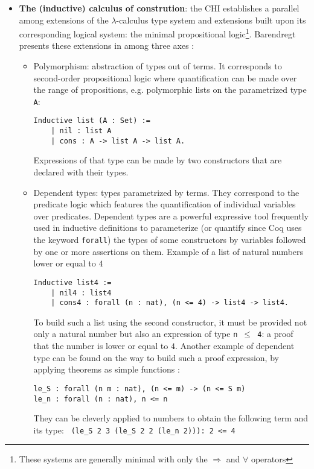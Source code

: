 \documentclass{article}
\newcounter{example}[section]
\begin{document}
\begin{itemize}
            \item \textbf{The (inductive) calculus of constrution}: the CHI establishes a parallel among extensions of the $\lambda$-calculus type system and extensions built upon its corresponding logical system: the minimal propositional logic\footnote{These systems are generally minimal with only the $\Rightarrow$ and $\forall$ operators}. Barendregt presents these extensions in \cite{10.5555/162552.162561} among three axes :
                \begin{itemize}
                    \item Polymorphism: abstraction of types out of terms. It corresponds to second-order propositional logic where quantification can be made over the range of propositions, e.g. polymorphic lists on the parametrized type \texttt{A}:
                    \begin{verbatim}Inductive list (A : Set) :=
    | nil : list A 
    | cons : A -> list A -> list A.\end{verbatim}
                     Expressions of that type can be made by two constructors that are declared with their types.
                    
                    \item Dependent types: types parametrized by terms. They correspond to the predicate logic which features the quantification of individual variables over predicates. Dependent types are a powerful expressive tool frequently used in inductive definitions to parameterize (or quantify since Coq uses the keyword \texttt{forall}) the types of some constructors by variables followed by one or more assertions on them. Example of a list of natural numbers lower or equal to $4$
                     \begin{verbatim}Inductive list4 :=
    | nil4 : list4 
    | cons4 : forall (n : nat), (n <= 4) -> list4 -> list4.\end{verbatim}
                    To build such a list using the second constructor, it must be provided not only a natural number but also an expression of type \texttt{n $\leq$ 4}: a proof that the number is lower or equal to $4$. Another example of dependent type can be found on the way to build such a proof expression, by applying theorems as simple functions :
                    \begin{verbatim}
le_S : forall (n m : nat), (n <= m) -> (n <= S m)
le_n : forall (n : nat), n <= n
                    \end{verbatim}
                    They can be cleverly applied to numbers to obtain the following term and its type: \verb| (le_S 2 3 (le_S 2 2 (le_n 2))): 2 <= 4|


\end{itemize}
\end{itemize}
\end{document}
